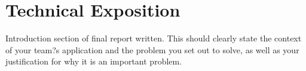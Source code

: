 \section{Technical Exposition}
\label{sec:Tech}
Introduction section of final report written.
This should clearly state the context of your team?s application and the problem you set out to solve, as well as your justification for why it is an important problem.

